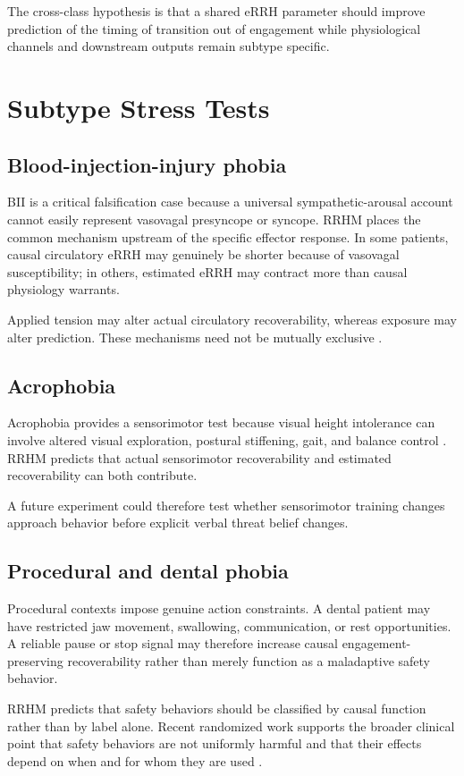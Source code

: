 \documentclass[11pt]{article}
\begin{document}
The cross-class hypothesis is that a shared eRRH parameter should improve prediction of the timing of transition out of engagement while physiological channels and downstream outputs remain subtype specific.

\section{Subtype Stress Tests}
\subsection{Blood-injection-injury phobia}
BII is a critical falsification case because a universal sympathetic-arousal account cannot easily represent vasovagal presyncope or syncope. RRHM places the common mechanism upstream of the specific effector response. In some patients, causal circulatory eRRH may genuinely be shorter because of vasovagal susceptibility; in others, estimated eRRH may contract more than causal physiology warrants.

Applied tension may alter actual circulatory recoverability, whereas exposure may alter prediction. These mechanisms need not be mutually exclusive \cite{ayala2009,ritz2010,ducasse2013}.

\subsection{Acrophobia}
Acrophobia provides a sensorimotor test because visual height intolerance can involve altered visual exploration, postural stiffening, gait, and balance control \cite{huppert2020,wuehr2015}. RRHM predicts that actual sensorimotor recoverability and estimated recoverability can both contribute.

A future experiment could therefore test whether sensorimotor training changes approach behavior before explicit verbal threat belief changes.

\subsection{Procedural and dental phobia}
Procedural contexts impose genuine action constraints. A dental patient may have restricted jaw movement, swallowing, communication, or rest opportunities. A reliable pause or stop signal may therefore increase causal engagement-preserving recoverability rather than merely function as a maladaptive safety behavior.

RRHM predicts that safety behaviors should be classified by causal function rather than by label alone. Recent randomized work supports the broader clinical point that safety behaviors are not uniformly harmful and that their effects depend on when and for whom they are used \cite{meckes2025}.
\end{document}
